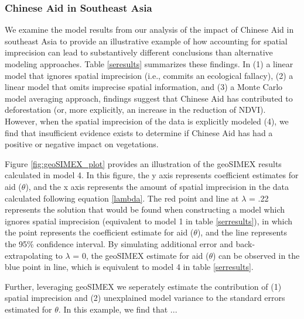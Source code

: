 \subsubsection{Chinese Aid in Southeast Asia}
We examine the model results from our analysis of the impact of Chinese Aid in southeast Asia to provide an illustrative example of how accounting for spatial imprecision can lead to substantively different conclusions than alternative modeling approaches.
Table \ref{seresults} summarizes these findings.
In (1) a linear model that ignores spatial imprecision (i.e., commits an ecological fallacy), (2) a linear model that omits imprecise spatial information, and (3) a Monte Carlo model averaging approach, findings suggest that Chinese Aid has contributed to deforestation (or, more explicitly, an increase in the reduction of NDVI).
However, when the spatial imprecision of the data is explicitly modeled (4), we find that insufficient evidence exists to determine if Chinese Aid has had a positive or negative impact on vegetations.
\par
Figure \ref{fig:geoSIMEX_plot} provides an illustration of the geoSIMEX results calculated in model 4.
In this figure, the y axis represents coefficient estimates for aid ($\theta$), and the x axis represents the amount of spatial imprecision in the data calculated following equation \ref{lambda}.
The red point and line at $\lambda$ = .22 represents the solution that would be found when constructing a model which ignores spatial imprecision (equivalent to model 1 in table \ref{serresults}), in which the point represents the coefficient estimate for aid ($\theta$), and the line represents the 95\% confidence interval.
By simulating additional error and back-extrapolating to $\lambda$ = 0, the geoSIMEX estimate for aid ($\theta$) can be observed in the blue point in line, which is equivalent to model 4 in table \ref{serresults}.
\par
Further, leveraging geoSIMEX we seperately estimate the contribution of (1) spatial imprecision and (2) unexplained model variance to the standard errors estimated for $\theta$.
In this example, we find that ...

\newpage

